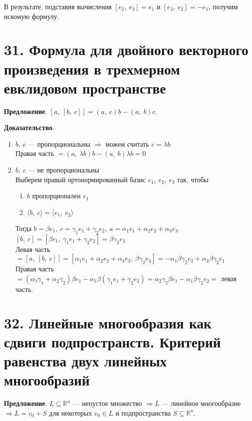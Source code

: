 \documentclass[a4paper, 12pt]{article}
\newcommand{\R}{\mathbb{R}}
\begin{document}
В результате, подставив вычисления $[e_2,\ e_3] = e_1$ и $[e_3,\ e_2] = -e_1$, получим искомую формулу.

\section*{31. Формула для двойного векторного произведения в трехмерном евклидовом пространстве}
\textbf{Предложение}. $[a,\ [b,\ c]] = (a,\ c)b - (a,\ b)c$.

\textbf{Доказательство}.
\vspace{-3mm}
\begin{enumerate}
\itemsep=0em
\item $b,\ c$ --- пропорциональны $\Longrightarrow$ можем считать $c = \lambda b$ \\
Правая часть $= (a,\ \lambda b)b - (a,\ b)\lambda b = 0$
\item $b,\ c$ --- не пропорциональны \\
Выберем правый ортонормированный базис $e_1,\ e_2,\ e_3$ так, чтобы
\vspace{-3mm}
\begin{enumerate}
\itemsep=-0.3em
\item $b$ пропорционален $e_1$
\item $\langle b,\ c \rangle = \langle e_1,\ e_2 \rangle$
\end{enumerate}
\vspace{-3mm}
Тогда $b = \beta e_1,\ c = \gamma_1 e_1 + \gamma_2 e_2,\ a = \alpha_1e_1 + \alpha_2e_2 + \alpha_3e_3$. \\
$[b,\ c] = [\beta e_1,\ \gamma_1e_1 + \gamma_2e_2] = \beta\gamma_2e_3$ \\
Левая часть $= [a,\ [b,\ c]] = [\alpha_1e_1 + \alpha_2e_2 + \alpha_3e_3,\ \beta\gamma_2e_3] = -\alpha_1\beta\gamma_2e_2 + \alpha_2\beta\gamma_2e_1$ \\
Правая часть $= (\alpha_1\gamma_1 + \alpha_2\gamma_2)\beta e_1 - \alpha_1\beta(\gamma_1e_1 + \gamma_2e_2) = \alpha_2\gamma_2\beta e_1 - \alpha_1\beta\gamma_2 e_2 =$ левая часть. 
\end{enumerate}

\section*{32. Линейные многообразия как сдвиги подпространств. Критерий равенства двух линейных многообразий}
\textbf{Предложение}. $L \subseteq \R^n$ --- непустое множество $\Rightarrow L$ --- линейное многообразие $\Rightarrow L = v_0 + S$ для некоторых $v_0 \in L$ и подпространства $S \subseteq \R^n$.
\end{document}

